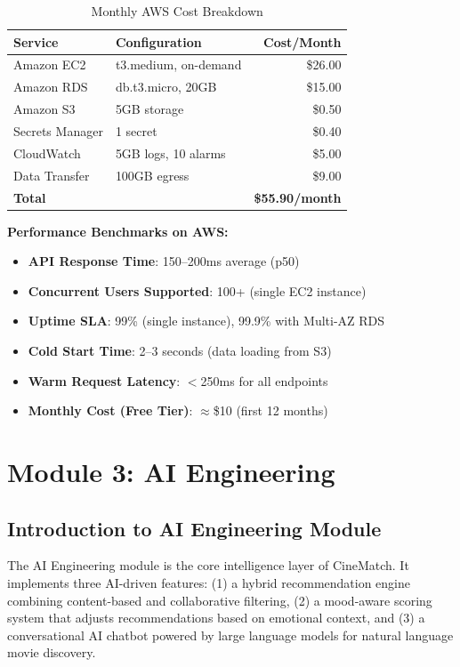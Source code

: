 \documentclass[12pt,a4paper]{report}
\begin{document}
\begin{table}[H]
\centering
\caption{Monthly AWS Cost Breakdown}
\begin{tabular}{|l|l|r|}
\hline
\textbf{Service} & \textbf{Configuration} & \textbf{Cost/Month} \\
\hline
Amazon EC2 & t3.medium, on-demand & \$26.00 \\
Amazon RDS & db.t3.micro, 20GB & \$15.00 \\
Amazon S3 & 5GB storage & \$0.50 \\
Secrets Manager & 1 secret & \$0.40 \\
CloudWatch & 5GB logs, 10 alarms & \$5.00 \\
Data Transfer & 100GB egress & \$9.00 \\
\hline
\textbf{Total} & & \textbf{\$55.90/month} \\
\hline
\end{tabular}
\end{table}

\textbf{Performance Benchmarks on AWS:}
\begin{itemize}
    \item \textbf{API Response Time}: 150--200ms average (p50)
    \item \textbf{Concurrent Users Supported}: 100+ (single EC2 instance)
    \item \textbf{Uptime SLA}: 99\% (single instance), 99.9\% with Multi-AZ RDS
    \item \textbf{Cold Start Time}: 2--3 seconds (data loading from S3)
    \item \textbf{Warm Request Latency}: $<$250ms for all endpoints
    \item \textbf{Monthly Cost (Free Tier)}: $\approx$\$10 (first 12 months)
\end{itemize}

\chapter{Module 3: AI Engineering}

\section{Introduction to AI Engineering Module}

The AI Engineering module is the core intelligence layer of CineMatch. It implements three AI-driven features: (1) a hybrid recommendation engine combining content-based and collaborative filtering, (2) a mood-aware scoring system that adjusts recommendations based on emotional context, and (3) a conversational AI chatbot powered by large language models for natural language movie discovery.
\end{document}
